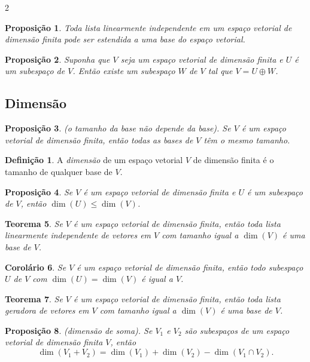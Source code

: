 \documentclass{article}
\theoremstyle{plain}
\newtheorem{thm}{Teorema}[section]
\newtheorem{prop}[thm]{Proposição}
\newtheorem{cor}[thm]{Corolário}
\theoremstyle{definition}
\newtheorem{defn}{Definição}[section]
\theoremstyle{remark}
\begin{document}
\begin{multicols}{2}
\begin{prop}
    Toda lista linearmente independente em um espaço vetorial de dimensão finita pode ser estendida a uma base do espaço vetorial.
\end{prop}

\begin{prop}
    Suponha que \(V\) seja um espaço vetorial de dimensão finita e \(U\) é um subespaço de \(V\). Então existe um subespaço \(W\) de \(V\) tal que \(V = U \oplus W\).
\end{prop}

\subsection{Dimensão}
\begin{prop} (o tamanho da base não depende da base).
    Se \(V\) é um espaço vetorial de dimensão finita, então todas as bases de \(V\) têm o mesmo tamanho.
\end{prop}

\begin{defn}
    A \emph{dimensão} de um espaço vetorial \(V\) de dimensão finita é o tamanho de qualquer base de \(V\).
\end{defn}

\begin{prop}
    Se \(V\) é um espaço vetorial de dimensão finita e \(U\) é um subespaço de \(V\), então \(\dim(U) \leq \dim(V)\).
\end{prop}

\begin{thm}
    Se \(V\) é um espaço vetorial de dimensão finita, então toda lista linearmente independente de vetores em \(V\) com tamanho igual a \(\dim(V)\) é uma base de \(V\).
\end{thm}

\begin{cor}
    Se \(V\) é um espaço vetorial de dimensão finita, então todo subespaço \(U\) de \(V\) com \(\dim(U) = \dim(V)\) é igual a \(V\).
\end{cor}

\begin{thm}
    Se \(V\) é um espaço vetorial de dimensão finita, então toda lista geradora de vetores em \(V\) com tamanho igual a \(\dim(V)\) é uma base de \(V\).
\end{thm}

\begin{prop} (dimensão de soma).
    Se \(V_1\) e \(V_2\) são subespaços de um espaço vetorial de dimensão finita \(V\), então
    \begin{equation}
        \dim(V_1 + V_2) = \dim(V_1) + \dim(V_2) - \dim(V_1 \cap V_2).
    \end{equation}
\end{prop}


\end{multicols}
\end{document}
